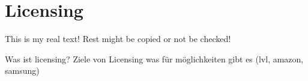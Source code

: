 \section{Licensing} \label{section:introduction-licensing}
This is my real text! Rest might be copied or not be checked!


Was ist licensing?\newline
Ziele von Licensing\newline
was für möglichkeiten gibt es (lvl, amazon, samsung)\newline
